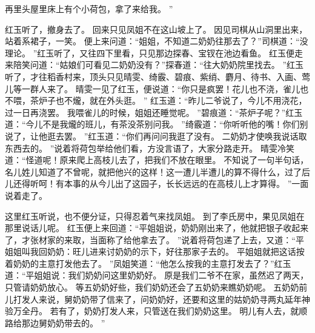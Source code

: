 再里头屋里床上有个小荷包，拿了来给我。
”\par
红玉听了，撤身去了。
回来只见凤姐不在这山坡上了。
因见司棋从山洞里出来，站着系裙子，一笑。
便上来问道：“姐姐，不知道二奶奶往那去了？”司棋道：“没理论。
”红玉听了，又往四下里看，只见那边探春、宝钗在池边看鱼。
红玉便走来陪笑问道：“姑娘们可看见二奶奶没有？”探春道：“往大奶奶院里找去。
”红玉听了，才往稻香村来，顶头只见晴雯、绮霰、碧痕、紫绡、麝月、待书、入画、莺儿等一群人来了。
晴雯一见了红玉，便说道：“你只是疯罢！花儿也不浇，雀儿也不喂，茶炉子也不爖，就在外头逛。
”
红玉道：“昨儿二爷说了，今儿不用浇花，过一日再浇罢。
我喂雀儿的时候，姐姐还睡觉呢。
”碧痕道：“茶炉子呢？”红玉道：“今儿不是我爖的班儿，有茶没茶别问我。
”绮霰道：“你听听他的嘴！你们别说了，让他逛去罢。
”红玉道：“你们再问问我逛了没有。
二奶奶才使唤我说话取东西去的。
”说着将荷包举给他们看，方没言语了，大家分路走开。
晴雯冷笑道：“怪道呢！原来爬上高枝儿去了，把我们不放在眼里。
不知说了一句半句话，名儿姓儿知道了不曾呢，就把他兴的这样！这一遭儿半遭儿的算不得什么，过了后儿还得听呵！有本事的从今儿出了这园子，长长远远的在高枝儿上才算得。
”一面说着走了。
\par
这里红玉听说，也不便分证，只得忍着气来找凤姐。
到了李氏房中，果见凤姐在那里说话儿呢。
红玉便上来回道：“平姐姐说，奶奶刚出来了，他就把银子收起来了，才张材家的来取，当面称了给他拿去了。
”说着将荷包递了上去，又道：“平姐姐叫我回奶奶：旺儿进来讨奶奶的示下，好往那家子去的。
平姐姐就把这话按着奶奶的主意打发他去了。
”凤姐笑道：“他怎么按我的主意打发去了？”红玉道：“平姐姐说：我们奶奶问这里奶奶好。
原是我们二爷不在家，虽然迟了两天，只管请奶奶放心。
等五奶奶好些，我们奶奶还会了五奶奶来瞧奶奶呢。
五奶奶前儿打发人来说，舅奶奶带了信来了，问奶奶好，还要和这里的姑奶奶寻两丸延年神验万全丹。
若有了，奶奶打发人来，只管送在我们奶奶这里。
明儿有人去，就顺路给那边舅奶奶带去的。
”\par
